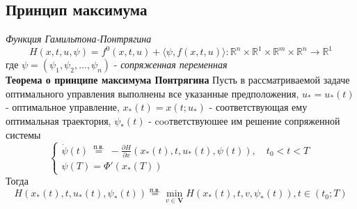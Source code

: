 \documentclass[A4]{article}
\begin{document}
\subsection{Принцип максимума}
\emph{Функция Гамильтона-Понтрягина}
\begin{equation*}
H(x,t,u,\psi)=f^0(x,t,u)+\langle\psi,f(x,t,u)\rangle:\mathbb{R}^n\times\mathbb{R}^1\times\mathbb{R}^m\times\mathbb{R}^n\rightarrow\mathbb{R}^1
\end{equation*}
где $\psi=(\psi_1,\psi_2,\ldots,\psi_n)$ - \emph{сопряженная переменная}\\
\textbf{Теорема о принципе максимума Понтрягина} Пусть в рассматриваемой задаче оптимального управления выполнены все указанные предположения, $ u_{*}=u_{*}(t) $ - оптимальное управление, $ x_{*}(t)=x\left(t ; u_{*}\right) $ - соответствующая ему оптимальная траектория, $ \psi_{*}(t) $ - cooтветствуюшее им решение сопряженной системы
\begin{equation*}
\left\{\begin{array}{l}
		\dot{\psi}(t) \stackrel{\text { п.в. }}{=}-\frac{\partial H}{\partial x}\left(x_{*}(t), t, u_{*}(t), \psi(t)\right), \quad t_{0}<t<T \\
		\psi(T)=\Phi'\left(x_{*}(T)\right)
	\end{array}\right. 
\end{equation*}
Тогда
\begin{equation*}
H\left(x_{*}(t), t, u_{*}(t), \psi_{*}(t)\right) \stackrel{\text {п.в.}}{=} \min _{v \in \mathbf{V}} H\left(x_{*}(t), t, v, \psi_{*}(t)\right), t \in\left(t_{0} ; T\right)
\end{equation*}
\end{document}
